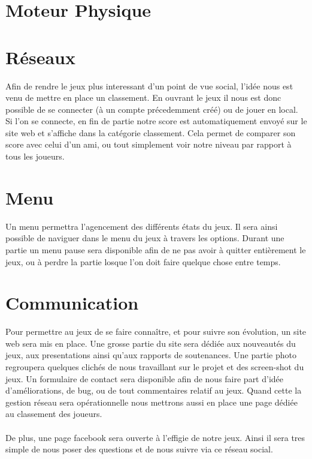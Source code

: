 \documentclass [11pt]{report}
\begin{document}
\newpage

	\section {Moteur Physique}


	\section {Réseaux}
	Afin de rendre le jeux plus interessant d'un point de vue social, l'idée nous est venu de mettre en place un classement. En ouvrant le jeux il nous est donc possible de se connecter (à un compte précedemment créé) ou de jouer en local. Si l'on se connecte, en fin de partie notre score est automatiquement envoyé sur le site web et s'affiche dans la catégorie classement. Cela permet de comparer son score avec celui d'un ami, ou tout simplement voir notre niveau par rapport à tous les joueurs.\\\vspace{10mm}


	\section {Menu}
	Un menu permettra l'agencement des différents états du jeux. Il sera ainsi possible de naviguer dans le menu du jeux à travers les options. Durant une partie un menu pause sera disponible afin de ne pas avoir à quitter entièrement le jeux, ou à perdre la partie losque l'on doit faire quelque chose entre temps.\\\vspace{5mm}


	\section {Communication}
	Pour permettre au jeux de se faire conna\^itre, et pour suivre son \'evolution, un site web sera mis en place. Une grosse partie du site sera dédiée aux nouveautés du jeux, aux presentations ainsi qu'aux rapports de soutenances. Une partie photo regroupera quelques clichés de nous travaillant sur le projet et des screen-shot du jeux. Un formulaire de contact sera disponible afin de nous faire part d'idée d'am\'eliorations, de bug, ou de tout commentaires relatif au jeux. Quand cette la gestion réseau sera opérationnelle nous mettrons aussi en place une page dédiée au classement des joueurs.
\\\\ \indent
	De plus, une page facebook sera ouverte à l'effigie de notre jeux. Ainsi il sera tres simple de nous poser des questions et de nous suivre via ce réseau social.
\end{document}
